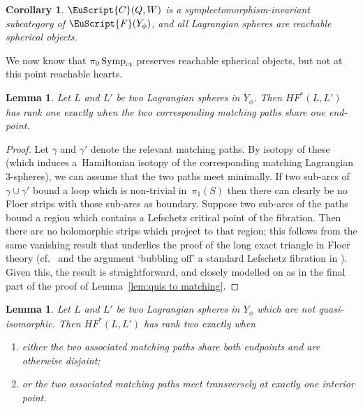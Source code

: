 \documentclass[10pt,a4paper]{amsart}
\newcommand{\scrF}{\EuScript{F}}
\newcommand{\scrC}{\EuScript{C}}
\DeclareMathOperator{\Symp}{Symp}
\newtheorem{lem}[thm]{Lemma}
\newtheorem{cor}[thm]{Corollary}
\theoremstyle{definition}
\numberwithin{equation}{section}
\begin{document}
\begin{cor}
 $\scrC(Q,W)$ is a symplectomorphism-invariant subcategory of $\scrF(Y_{\phi})$, and all Lagrangian spheres are reachable spherical objects.
\end{cor}

We now know that $\pi_0\Symp_{\rm ct}$ preserves reachable spherical objects, but not at this point reachable hearts.

\begin{lem} \label{lem:HF rank one}
Let $L$ and $L'$ be two Lagrangian spheres in $Y_\phi$. Then $HF^*(L,L')$ has rank one exactly when the two corresponding matching paths share one end-point.
\end{lem}

\begin{proof}
Let $\gamma$ and $\gamma'$ denote the relevant matching paths. By isotopy of these (which induces a~Hamiltonian isotopy of the corresponding matching Lagrangian 3-spheres), we can assume that the two paths meet minimally. If two sub-arcs of~$\gamma \cup \gamma'$ bound a loop which is non-trivial in~$\pi_1(S)$ then there can clearly be no Floer strips with those sub-arcs as boundary. Suppose two sub-arcs of the paths bound a region which contains a Lefschetz critical point of the fibration. Then there are no holomorphic strips which project to that region; this follows from the same vanishing result that underlies the proof of the long exact triangle in Floer theory (cf.~\cite[Lemma 17.4, Remark~17.8]{Seidel:FCPLT} and the argument `bubbling off' a standard Lefschetz fibration in \cite[Section 17d]{Seidel:FCPLT}). Given this, the result is straightforward, and closely modelled on \cite{Khovanov-Seidel} as in the final part of the proof of Lemma~\ref{lem:quis to matching}.
\end{proof}

\begin{lem} \label{lem:HF rank two}
Let $L$ and $L'$ be two Lagrangian spheres in $Y_\phi$ which are not quasi-isomorphic. Then $HF^*(L,L')$ has rank two exactly when
\begin{enumerate}\itemsep=0pt
\item[$(1)$] either the two associated matching paths share both endpoints and are otherwise disjoint;
\item[$(2)$] or the two associated matching paths meet transversely at exactly one interior point.
\end{enumerate}
\end{lem}
\end{document}

